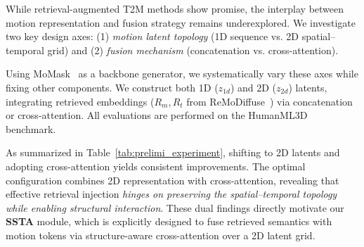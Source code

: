 \documentclass[10pt,journal,compsoc]{IEEEtran}
\begin{document}


While retrieval-augmented T2M methods show promise, the interplay between motion representation and fusion strategy remains underexplored. We investigate two key design axes: (1) \emph{motion latent topology} (1D sequence vs. 2D spatial–temporal grid) and (2) \emph{fusion mechanism} (concatenation vs. cross-attention).

Using MoMask~\cite{momask} as a backbone generator, we systematically vary these axes while fixing other components. We construct both 1D ($z_{1d}$) and 2D ($z_{2d}$) latents, integrating retrieved embeddings ($R_m, R_t$ from ReMoDiffuse~\cite{remodiffuse}) via concatenation or cross-attention. All evaluations are performed on the HumanML3D benchmark.

As summarized in Table~\ref{tab:prelimi_experiment}, shifting to 2D latents and adopting cross-attention yields consistent improvements. The optimal configuration combines 2D representation with cross-attention, revealing that effective retrieval injection \emph{hinges on preserving the spatial–temporal topology while enabling structural interaction}. These dual findings directly motivate our \textbf{SSTA} module, which is explicitly designed to fuse retrieved semantics with motion tokens via structure-aware cross-attention over a 2D latent grid.
\end{document}
